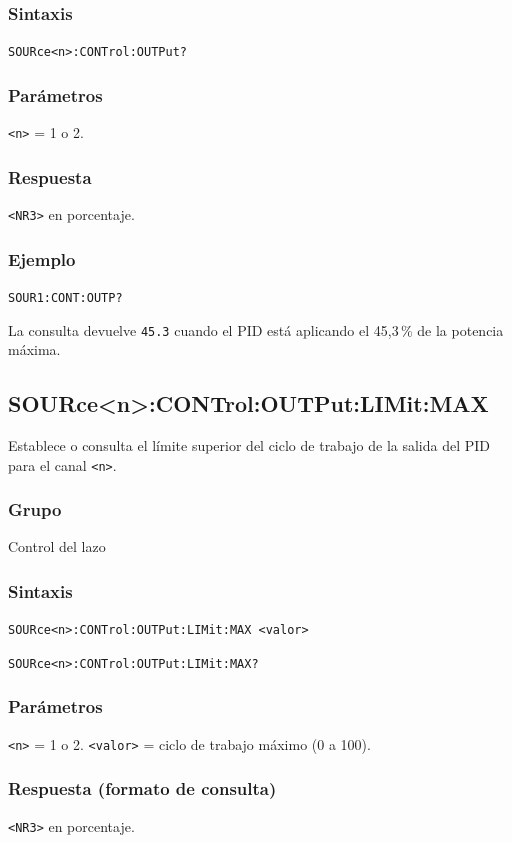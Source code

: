 \subsubsection*{Sintaxis}
\texttt{SOURce<n>:CONTrol:OUTPut?}

\subsubsection*{Parámetros}
\texttt{<n>} = 1 o 2.

\subsubsection*{Respuesta}
\texttt{<NR3>} en porcentaje.

\subsubsection*{Ejemplo}
\texttt{SOUR1:CONT:OUTP?}

La consulta devuelve \texttt{45.3} cuando el PID está aplicando el
45,3\,\% de la potencia máxima.

\subsection*{SOURce<n>:CONTrol:OUTPut:LIMit:MAX}

Establece o consulta el límite superior del ciclo de trabajo de la salida
del PID para el canal \texttt{<n>}.

\subsubsection*{Grupo}
Control del lazo

\subsubsection*{Sintaxis}
\texttt{SOURce<n>:CONTrol:OUTPut:LIMit:MAX <valor>}\par
\texttt{SOURce<n>:CONTrol:OUTPut:LIMit:MAX?}

\subsubsection*{Parámetros}
\texttt{<n>} = 1 o 2. \texttt{<valor>} = ciclo de trabajo máximo (0 a 100).

\subsubsection*{Respuesta (formato de consulta)}
\texttt{<NR3>} en porcentaje.

